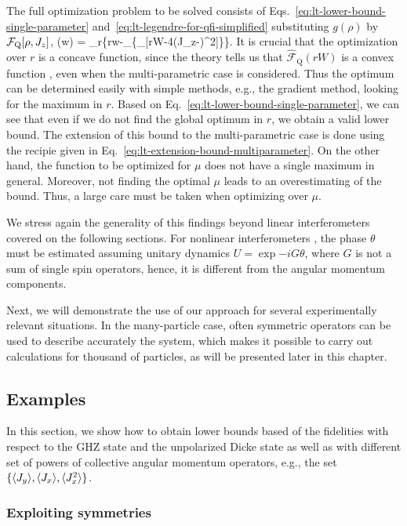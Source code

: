 The full optimization problem to be solved consists of Eqs.~\eqref{eq:lt-lower-bound-single-parameter} and~\eqref{eq:lt-legendre-for-qfi-simplified} substituting $g(\rho)$ by $\mathcal{F}_{\textnormal{Q}}[{\textstyle \rho,J_z}]$,
\be
  (w) = \sup_r\big\{rw-\sup_{\mu}\{\lambda_{\max}[rW-4(J_z-\mu)^2]\}\big\}.
\ee
It is crucial that the optimization over $r$ is a concave function, since the theory tells us that $\hat{\mathcal{F}}_{\text{Q}}(rW)$ is a convex function \cite{}, even when the multi-parametric case is considered.
Thus the optimum can be determined easily with simple methods, e.g., the gradient method, looking for the maximum in $r$.
Based on Eq.~\eqref{eq:lt-lower-bound-single-parameter}, we can see that even if we do not find the global optimum in $r$, we obtain a valid lower bound.
The extension of this bound to the multi-parametric case is done using the recipie given in Eq.~\eqref{eq:lt-extension-bound-multiparameter}.
On the other hand, the function to be optimized for $\mu$ does not have a single maximum in general.
Moreover, not finding the optimal $\mu$ leads to an overestimating of the bound.
Thus, a large care must be taken when optimizing over $\mu$.

We stress again the generality of this findings beyond linear interferometers covered on the following sections.
For nonlinear interferometers \cite{}, the phase $\theta$ must be estimated assuming unitary dynamics $U=\exp{-iG\theta}$, where $G$ is not a sum of single spin operators, hence, it is different from the angular momentum components.

Next, we will demonstrate the use of our approach for several experimentally relevant situations.
In the many-particle case, often symmetric operators can be used to describe accurately the system, which makes it possible to carry out calculations for thousand of particles, as will be presented later in this chapter.

\subsection{Examples}
\label{sec:lt-examples}

In this section, we show how to obtain lower bounds based of the fidelities with respect to the GHZ state and the unpolarized Dicke state as well as with different set of powers of collective angular momentum operators, e.g., the set $\{\langle{J_y}\rangle, \langle{J_x}\rangle, \langle{J_x^2}\rangle\}$.

\subsubsection{Exploiting symmetries}
\label{sec:lt-symmetries}

